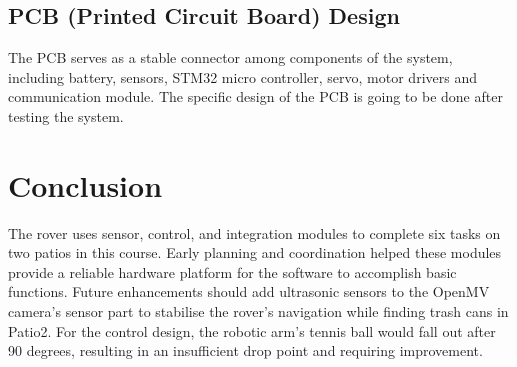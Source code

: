 \documentclass{solutionclass} %
\begin{document}
    \subsection*{PCB (Printed Circuit Board) Design}
    The PCB serves as a stable connector among components of the system, including battery, sensors, STM32 micro controller, servo, motor drivers and communication module. The specific design of the PCB is going to be done after testing the system.
    
\section{Conclusion}
The rover uses sensor, control, and integration modules to complete six tasks on two patios in this course. Early planning and coordination helped these modules provide a reliable hardware platform for the software to accomplish basic functions. Future enhancements should add ultrasonic sensors to the OpenMV camera's sensor part to stabilise the rover's navigation while finding trash cans in Patio2. For the control design, the robotic arm's tennis ball would fall out after 90 degrees, resulting in an insufficient drop point and requiring improvement.

\vspace{1cm}


 
\end{document}
